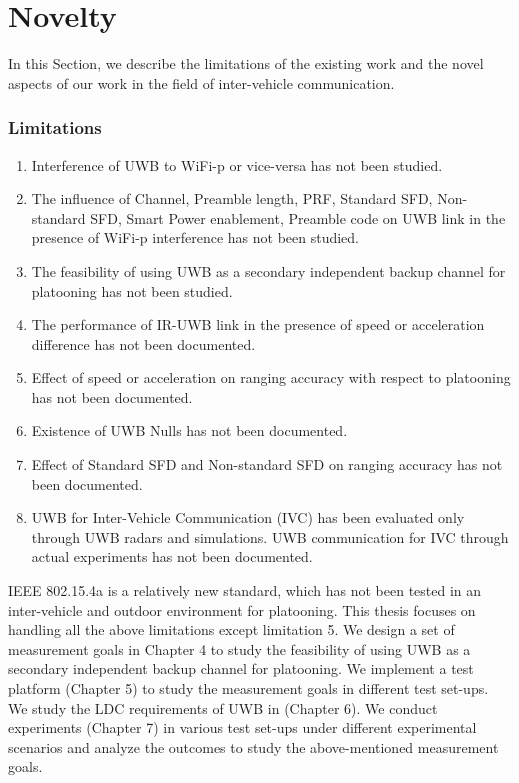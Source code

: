 \section{Novelty}
In this Section, we describe the limitations of the existing work and the novel aspects of our work in the field of inter-vehicle communication.

\subsubsection{Limitations}
\begin{enumerate}
	
	\item Interference of UWB to WiFi-p or vice-versa has not been studied.
	\item The influence of Channel, Preamble length, PRF, Standard SFD, Non-standard SFD, Smart Power enablement, Preamble code on UWB link in the presence of WiFi-p interference has not been studied.
	\item The feasibility of using UWB as a secondary independent backup channel for platooning has not been studied.
	\item The performance of IR-UWB link in the presence of speed or acceleration difference has not been documented.
	\item Effect of speed or acceleration on ranging accuracy with respect to platooning has not been documented.
	\item Existence of UWB Nulls has not been documented.
	\item Effect of Standard SFD and Non-standard SFD on ranging accuracy has not been documented.
	\item UWB for Inter-Vehicle Communication (IVC) has been evaluated only through UWB radars and simulations. UWB communication for IVC through actual experiments has not been documented.
\end{enumerate}

IEEE 802.15.4a is a relatively new standard, which has not been tested in an inter-vehicle and outdoor environment for platooning. This thesis focuses on handling all the above limitations except limitation 5. We design a set of measurement goals in Chapter 4 to study the feasibility of using UWB as a secondary independent backup channel for platooning. We implement a test platform (Chapter 5) to study the measurement goals in different test set-ups. We study the LDC requirements of UWB in (Chapter 6). We conduct experiments (Chapter 7) in various test set-ups under different experimental scenarios and analyze the outcomes to study the above-mentioned measurement goals.

